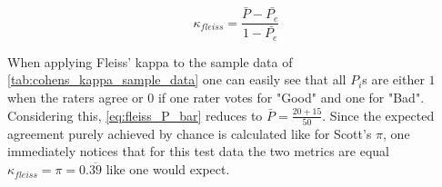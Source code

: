 \begin{equation}\label{eq:fleiss_kappa}
    \kappa_{fleiss} = \frac{\bar{P}-\bar{P_e}}{1-\bar{P_e}}
\end{equation}

When applying Fleiss' kappa to the sample data of \cref{tab:cohens_kappa_sample_data} one can easily see that all $P_i$s are either $1$ when the raters agree or $0$ if one rater votes for "Good" and one for "Bad".
Considering this, \cref{eq:fleiss_P_bar} reduces to $\bar{P} = \frac{20+15}{50}$.
Since the expected agreement purely achieved by chance is calculated like for Scott's $\pi$, one immediately notices that for this test data the two metrics are equal $\kappa_{fleiss} = \pi = 0.\overline{39}$ like one would expect.
